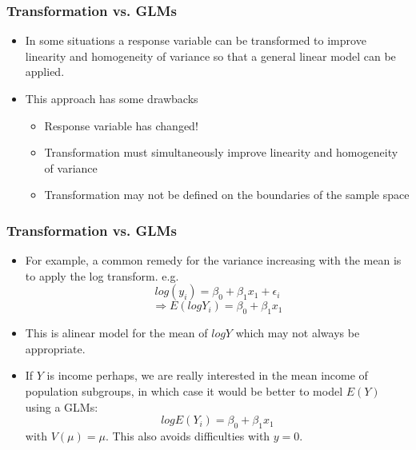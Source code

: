 \documentclass[10pt,xcolor={svgnames},t]{beamer}
\begin{document}
\begin{frame}
	\frametitle{Transformation vs. GLMs}
	
	\begin{itemize}
		\item In some situations a response variable can be transformed to improve linearity and homogeneity of variance so that a general linear model can be applied.
		\bigskip
		\item This approach has some drawbacks
		\begin{itemize}
			\item Response variable has changed!
			\item Transformation must simultaneously improve linearity and homogeneity of variance
			\item Transformation may not be defined on the boundaries of the sample space
		\end{itemize}
		
	\end{itemize}
	
	
\end{frame}
%
\begin{frame}
	\frametitle{Transformation vs. GLMs}
	
	\begin{itemize}
		\item For example, a common remedy for the variance increasing with the mean is to apply the log transform. e.g.
		$$
		log(y_i)=\beta_0 +\beta_1 x_1 +\epsilon_i
		$$
		$$ \Rightarrow E(logY_i )=\beta_0 +\beta_1x_1
		$$
		
	\item[] This is alinear model for the mean of $logY$ which may not always be appropriate.	
	\bigskip
	\item If $Y$ is income perhaps, we are really interested in the mean income of population subgroups, in which case it would be better to model $E(Y)$ using a GLMs:
	$$ logE(Y_i)=\beta_0 +\beta_1x_1
	$$
	with $V(\mu )=\mu$. This also avoids difficulties with $y=0$.
	\end{itemize}
	
	
\end{frame}
%
%
\end{document}

